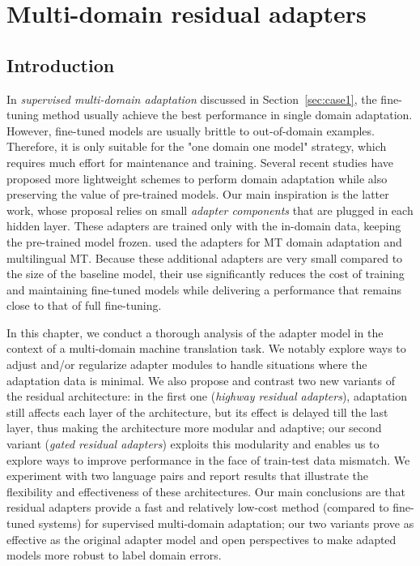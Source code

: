 \chapter{Multi-domain residual adapters}
\label{chap:res}
\section{Introduction}
In \emph{supervised multi-domain adaptation} discussed in Section~\ref{sec:case1}, the fine-tuning method \citep{Luong15stanford,Freitag16fast} usually achieve the best performance in single domain adaptation. However, fine-tuned models are usually brittle to out-of-domain examples. Therefore, it is only suitable for the "one domain one model" strategy, which requires much effort for maintenance and training. Several recent studies \citep{Vilar18learning,Wuebker18compact,Michel18extreme,Bapna19simple} have proposed more lightweight schemes to perform domain adaptation while also preserving the value of pre-trained models. Our main inspiration is the latter work, whose proposal relies on small \emph{adapter components} \citep{Bapna19simple} that are plugged in each hidden layer. These adapters are trained only with the in-domain data, keeping the pre-trained model frozen. \citet{Bapna19simple} used the adapters for MT domain adaptation and multilingual MT. Because these additional adapters are very small compared to the size of the baseline model, their use significantly reduces the cost of training and maintaining fine-tuned models while delivering a performance that remains close to that of full fine-tuning.

In this chapter, we conduct a thorough analysis of the adapter model in the context of a multi-domain machine translation task. We notably explore ways to adjust and/or regularize adapter modules to handle situations where the adaptation data is minimal. We also propose and contrast two new variants of the residual architecture: in the first one (\emph{highway residual adapters}), adaptation still affects each layer of the architecture, but its effect is delayed till the last layer, thus making the architecture more modular and adaptive; our second variant (\emph{gated residual adapters}) exploits this modularity and enables us to explore ways to improve performance in the face of train-test data mismatch. We experiment with two language pairs and report results that illustrate the flexibility and effectiveness of these architectures. Our main conclusions are that residual adapters provide a fast and relatively low-cost method (compared to fine-tuned systems) for supervised multi-domain adaptation; our two variants prove as effective as the original adapter model and open perspectives to make adapted models more robust to label domain errors.

